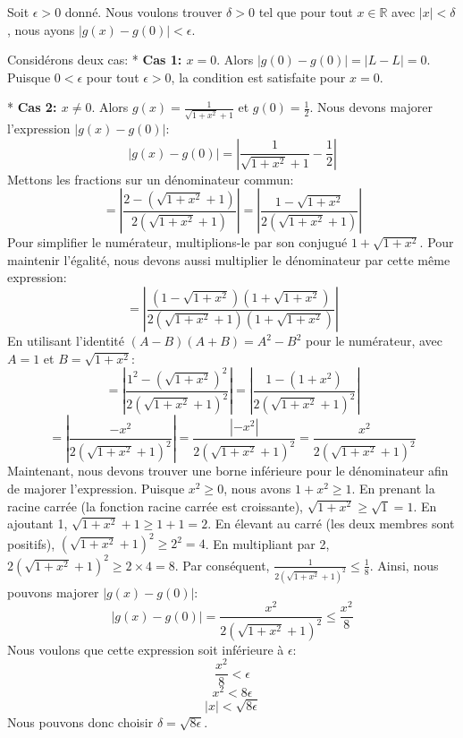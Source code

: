 \documentclass[12pt,a4paper]{report}
\begin{document}
    Soit $\epsilon > 0$ donné.
    Nous voulons trouver $\delta > 0$ tel que pour tout $x \in \mathbb{R}$ avec $|x| < \delta$, nous ayons $|g(x) - g(0)| < \epsilon$.

    Considérons deux cas:
    *   \textbf{Cas 1: $x = 0$}.
        Alors $|g(0) - g(0)| = |L - L| = 0$. Puisque $0 < \epsilon$ pour tout $\epsilon > 0$, la condition est satisfaite pour $x=0$.

    *   \textbf{Cas 2: $x \neq 0$}.
        Alors $g(x) = \frac{1}{\sqrt{1+x^2} + 1}$ et $g(0) = \frac{1}{2}$.
        Nous devons majorer l'expression $|g(x) - g(0)|$:
        $$ |g(x) - g(0)| = \left| \frac{1}{\sqrt{1+x^2} + 1} - \frac{1}{2} \right| $$
        Mettons les fractions sur un dénominateur commun:
        $$ = \left| \frac{2 - (\sqrt{1+x^2} + 1)}{2(\sqrt{1+x^2} + 1)} \right| = \left| \frac{1 - \sqrt{1+x^2}}{2(\sqrt{1+x^2} + 1)} \right| $$
        Pour simplifier le numérateur, multiplions-le par son conjugué $1 + \sqrt{1+x^2}$. Pour maintenir l'égalité, nous devons aussi multiplier le dénominateur par cette même expression:
        $$ = \left| \frac{(1 - \sqrt{1+x^2})(1 + \sqrt{1+x^2})}{2(\sqrt{1+x^2} + 1)(1 + \sqrt{1+x^2})} \right| $$
        En utilisant l'identité $(A-B)(A+B) = A^2 - B^2$ pour le numérateur, avec $A=1$ et $B=\sqrt{1+x^2}$:
        $$ = \left| \frac{1^2 - (\sqrt{1+x^2})^2}{2(\sqrt{1+x^2} + 1)^2} \right| = \left| \frac{1 - (1+x^2)}{2(\sqrt{1+x^2} + 1)^2} \right| $$
        $$ = \left| \frac{-x^2}{2(\sqrt{1+x^2} + 1)^2} \right| = \frac{|-x^2|}{2(\sqrt{1+x^2} + 1)^2} = \frac{x^2}{2(\sqrt{1+x^2} + 1)^2} $$
        Maintenant, nous devons trouver une borne inférieure pour le dénominateur afin de majorer l'expression.
        Puisque $x^2 \ge 0$, nous avons $1+x^2 \ge 1$.
        En prenant la racine carrée (la fonction racine carrée est croissante), $\sqrt{1+x^2} \ge \sqrt{1} = 1$.
        En ajoutant 1, $\sqrt{1+x^2} + 1 \ge 1+1 = 2$.
        En élevant au carré (les deux membres sont positifs), $(\sqrt{1+x^2} + 1)^2 \ge 2^2 = 4$.
        En multipliant par 2, $2(\sqrt{1+x^2} + 1)^2 \ge 2 \times 4 = 8$.
        Par conséquent, $\frac{1}{2(\sqrt{1+x^2} + 1)^2} \le \frac{1}{8}$.
        Ainsi, nous pouvons majorer $|g(x) - g(0)|$:
        $$ |g(x) - g(0)| = \frac{x^2}{2(\sqrt{1+x^2} + 1)^2} \le \frac{x^2}{8} $$
        Nous voulons que cette expression soit inférieure à $\epsilon$:
        $$ \frac{x^2}{8} < \epsilon $$
        $$ x^2 < 8\epsilon $$
        $$ |x| < \sqrt{8\epsilon} $$
        Nous pouvons donc choisir $\delta = \sqrt{8\epsilon}$.
\end{document}
